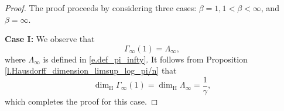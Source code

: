 \documentclass[10pt,a4paper]{amsart}
\begin{document}
  \begin{proof}
  The proof proceeds by considering three cases: $\beta=1, 1<\beta <\infty$, and $\beta =\infty$.

\textbf{Case I: } We observe that
\begin{equation*}
            {\Gamma}_{\infty}(1) = \Lambda_{\infty},
        \end{equation*}
        where $\Lambda_{\infty}$ is defined in \eqref{e.def_pi_infty}. It follows from Proposition \ref{l.Hausdorff_dimension_limsup_log_pi/n} that
        \begin{equation}\label{e.dim_Gamma<1/2}
                \dim_{\mathrm{H}}{\Gamma}_{\infty}(1)=\dim_{\mathrm{H}}\Lambda_{\infty}
                =\frac{1}{\gamma},
        \end{equation}
        which completes the proof for this case.



\end{proof}
\end{document}
